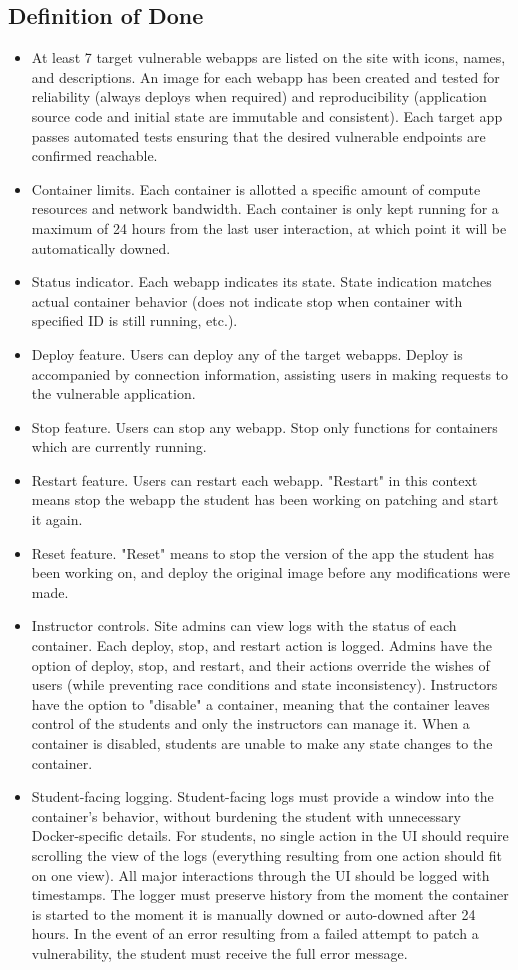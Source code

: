 \documentclass[12pt,titlepage]{article}
\begin{document}
\subsection{Definition of Done}
\begin{itemize}
	\item At least 7 target vulnerable webapps are listed on the site with icons, names, and descriptions. An image for each webapp has been created and tested for reliability (always deploys when required) and reproducibility (application source code and initial state are immutable and consistent). Each target app passes automated tests ensuring that the desired vulnerable endpoints are confirmed reachable.
	\item Container limits. Each container is allotted a specific amount of compute resources and network bandwidth. Each container is only kept running for a maximum of 24 hours from the last user interaction, at which point it will be automatically downed.
	\item Status indicator. Each webapp indicates its state. State indication matches actual container behavior (does not indicate stop when container with specified ID is still running, etc.).
	\item Deploy feature. Users can deploy any of the target webapps. Deploy is accompanied by connection information, assisting users in making requests to the vulnerable application.
	\item Stop feature. Users can stop any webapp. Stop only functions for containers which are currently running.
	\item Restart feature. Users can restart each webapp. "Restart" in this context means stop the webapp the student has been working on patching and start it again.
	\item Reset feature. "Reset" means to stop the version of the app the student has been working on, and deploy the original image before any modifications were made.
	\item Instructor controls. Site admins can view logs with the status of each container. Each deploy, stop, and restart action is logged. Admins have the option of deploy, stop, and restart, and their actions override the wishes of users (while preventing race conditions and state inconsistency). Instructors have the option to "disable" a container, meaning that the container leaves control of the students and only the instructors can manage it. When a container is disabled, students are unable to make any state changes to the container.
	\item Student-facing logging. Student-facing logs must provide a window into the container's behavior, without burdening the student with unnecessary Docker-specific details. For students, no single action in the UI should require scrolling the view of the logs (everything resulting from one action should fit on one view). All major interactions through the UI should be logged with timestamps. The logger must preserve history from the moment the container is started to the moment it is manually downed or auto-downed after 24 hours. In the event of an error resulting from a failed attempt to patch a vulnerability, the student must receive the full error message.

\end{itemize}
\end{document}
